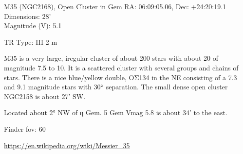 \begin{block}{M35 (NGC2168), Open Cluster in Gem}
    RA: 06:09:05.06, Dec: +24:20:19.1 \\ 
    Dimensions: 28' \\ 
    Magnitude (V): 5.1

    TR Type: III 2 m

    M35 is a very large, iregular cluster of about 200 stars with about 20 of
    magnitude 7.5 to 10. It is a scattered cluster with several groups and
    chains of stars. There is a nice blue/yellow double, OΣ134 in the NE
    consisting of a 7.3 and 9.1 magnitude stars with 30`` separation. The small
    dense open cluster NGC2158 is about 27' SW.

    Located about 2° NW of η Gem. 5 Gem Vmag 5.8 is about 34' to the east. 



    Finder fov: 60 

    \url{https://en.wikipedia.org/wiki/Messier_35} 
\end{block}
